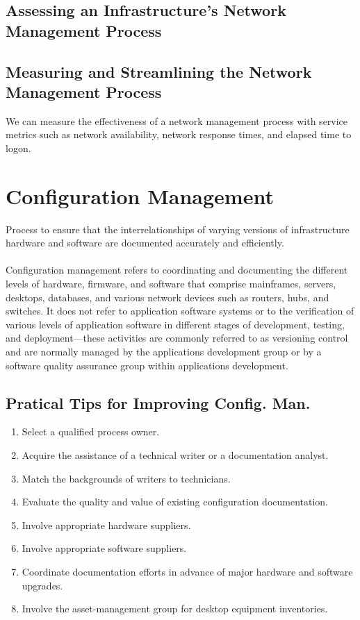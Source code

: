 \documentclass[a4]{article}
\begin{document}
\begin{multicols}{3}
\subsection{Assessing an Infrastructure’s Network Management Process}
\subsection{Measuring and Streamlining the Network Management Process}
We can measure the effectiveness of a network management process with service metrics such as network availability, 
network response times, and elapsed time to logon.

\section{Configuration Management}
Process to ensure that the interrelationships of varying versions of infrastructure hardware and software are
documented accurately and efficiently. \\
\\
Configuration management refers to coordinating and documenting the different levels of hardware, firmware, and 
software that comprise mainframes, servers, desktops, databases, and various network devices such as routers, hubs,
and switches. It does not refer to application software systems or to the verification of various levels of application
software in different stages of development, testing, and deployment—these activities are commonly referred to as
versioning control and are normally managed by the applications development group or by a software quality assurance 
group within applications development.

\subsection{Pratical Tips for Improving Config. Man.}
\begin{enumerate}
    \item Select a qualified process owner.
    \item Acquire the assistance of a technical writer or a documentation analyst.
    \item Match the backgrounds of writers to technicians.
    \item Evaluate the quality and value of existing configuration documentation.
    \item Involve appropriate hardware suppliers.
    \item Involve appropriate software suppliers.
    \item Coordinate documentation efforts in advance of major hardware and software upgrades.
    \item Involve the asset-management group for desktop equipment inventories.
\end{enumerate}


\end{multicols}
\end{document}
